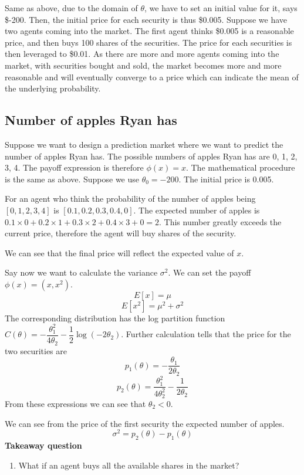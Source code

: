 \documentclass{article}
\begin{document}
Same as above, due to the domain of $\theta$, we have to set an initial value for it, says \$-200. Then, the initial price for each security is thus \$0.005. Suppose we have two agents coming into the market. The first agent thinks \$0.005 is a reasonable price, and then buys 100 shares of the securities. The price for each securities is then leveraged to \$0.01. As there are more and more agents coming into the market, with securities bought and sold, the market becomes more and more reasonable and will eventually converge to a price which can indicate the mean of the underlying probability.

\subsection{Number of apples Ryan has}
Suppose we want to design a prediction market where we want to predict the number of apples Ryan has. The possible numbers of apples Ryan has are 0, 1, 2, 3, 4. The payoff expression is therefore $\phi(x)=x$. The mathematical procedure is the same as above. Suppose we use $\theta_0=-200$. The initial price is 0.005. 

For an agent who think the probability of the number of apples being $[0,1,2,3,4]$ is $[0.1, 0.2, 0.3, 0.4, 0]$. The expected number of apples is $0.1\times0+0.2\times1+0.3\times2+0.4\times3+0=2$. This number greatly exceeds the current price, therefore the agent will buy shares of the security. 

We can see that the final price will reflect the expected value of $x$.

Say now we want to calculate the variance $\sigma^2$. We can set the payoff $\phi(x)=(x,x^2)$. 
\begin{displaymath}
E[x]=\mu
\end{displaymath}
\begin{displaymath}
E[x^2]=\mu^2+\sigma^2
\end{displaymath}
The corresponding distribution has the log partition function $C(\theta)=-\dfrac{\theta_1^2}{4\theta_2}-\dfrac{1}{2}\log(-2\theta_2)$.
Further calculation tells that the price for the two securities are
\begin{displaymath}
p_1(\theta)=-\frac{\theta_1}{2\theta_2}
\end{displaymath}
\begin{displaymath}
p_2(\theta)=\frac{\theta_1^2}{4\theta_2^2}-\frac{1}{2\theta_2}
\end{displaymath}
From these expressions we can see that $\theta_2<0$.

We can see from the price of the first security the expected number of apples. 
\begin{displaymath}
\sigma^2=p_2(\theta)-p_1(\theta)
\end{displaymath}
\textbf{Takeaway question}
\begin{enumerate}
    \item What if an agent buys all the available shares in the market?
\end{enumerate}
\end{document}
